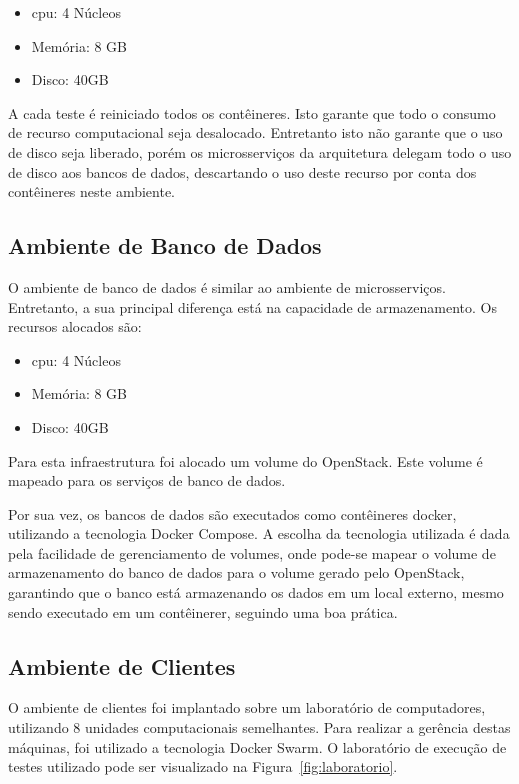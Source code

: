 \begin{itemize}
  \item \ac{cpu}: 4 Núcleos
  \item Memória: 8 GB
  \item Disco: 40GB
\end{itemize}

A cada teste é reiniciado todos os contêineres. Isto garante que todo o consumo de recurso computacional seja desalocado.
%
Entretanto isto não garante que o uso de disco seja liberado, porém os microsserviços da arquitetura delegam todo o uso de disco aos bancos de dados, descartando o uso deste recurso por conta dos contêineres neste ambiente.

\subsection{Ambiente de Banco de Dados}
\label{sec:ambiente_db}

O ambiente de banco de dados é similar ao ambiente de microsserviços.
%
Entretanto, a sua principal diferença está na capacidade de armazenamento. Os recursos alocados são:

\begin{itemize}
  \item \ac{cpu}: 4 Núcleos
  \item Memória: 8 GB
  \item Disco: 40GB
\end{itemize}

Para esta infraestrutura foi alocado um volume do OpenStack.
%
Este volume é mapeado para os serviços de banco de dados.

Por sua vez, os bancos de dados são executados como contêineres docker, utilizando a tecnologia Docker Compose.
%
A escolha da tecnologia utilizada é dada pela facilidade de gerenciamento de volumes, onde pode-se mapear o volume de armazenamento do banco de dados para o volume gerado pelo OpenStack, garantindo que o banco está armazenando os dados em um local externo, mesmo sendo executado em um contêinerer, seguindo uma boa prática.

\subsection{Ambiente de Clientes}
\label{sec:ambiente_cli}

O ambiente de clientes foi implantado sobre um laboratório de computadores, utilizando 8 unidades computacionais semelhantes.
%
Para realizar a gerência destas máquinas, foi utilizado a tecnologia Docker Swarm.
%
O laboratório de execução de testes utilizado pode ser visualizado na Figura~\ref{fig:laboratorio}.

